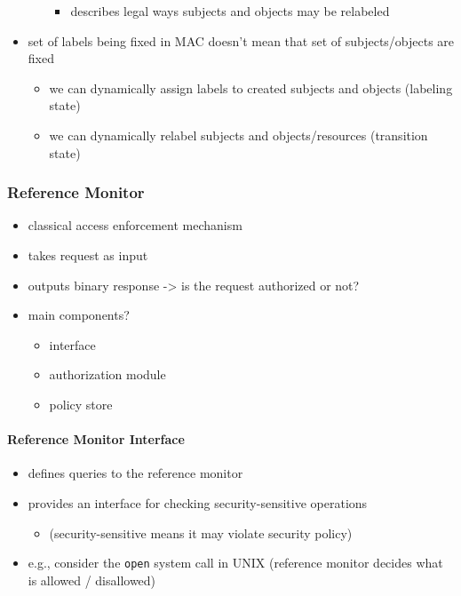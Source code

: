 \documentclass[
  12pt]{findlay}
\newcommand{\passthrough}[1]{#1}
\providecommand{\tightlist}{%
  \setlength{\itemsep}{0pt}\setlength{\parskip}{0pt}}
\begin{document}
\begin{itemize}
\begin{itemize}
    \begin{itemize}
    \tightlist
    \item
      describes legal ways subjects and objects may be relabeled
    \end{itemize}
  \end{itemize}
\item
  set of labels being fixed in MAC doesn't mean that set of
  subjects/objects are fixed

  \begin{itemize}
  \tightlist
  \item
    we can dynamically assign labels to created subjects and objects
    (labeling state)
  \item
    we can dynamically relabel subjects and objects/resources
    (transition state)
  \end{itemize}
\end{itemize}

\hypertarget{reference-monitor}{%
\subsubsection{Reference Monitor}\label{reference-monitor}}

\begin{itemize}
\tightlist
\item
  classical access enforcement mechanism
\item
  takes request as input
\item
  outputs binary response -\textgreater{} is the request authorized or
  not?
\item
  main components?

  \begin{itemize}
  \tightlist
  \item
    interface
  \item
    authorization module
  \item
    policy store
  \end{itemize}
\end{itemize}

\hypertarget{reference-monitor-interface}{%
\paragraph{Reference Monitor
Interface}\label{reference-monitor-interface}}

\begin{itemize}
\tightlist
\item
  defines queries to the reference monitor
\item
  provides an interface for checking security-sensitive operations

  \begin{itemize}
  \tightlist
  \item
    (security-sensitive means it may violate security policy)
  \end{itemize}
\item
  e.g., consider the \passthrough{\lstinline!open!} system call in UNIX
  (reference monitor decides what is allowed / disallowed)
\end{itemize}
\end{document}
